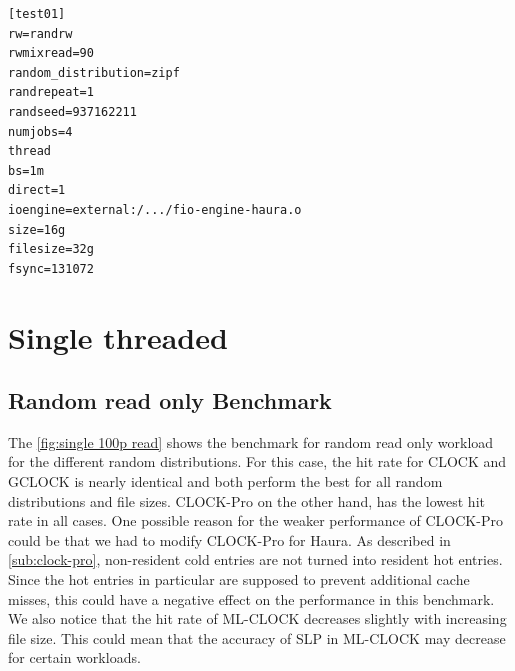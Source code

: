 \documentclass[
	12pt,
	a4paper,
	abstract,
	bibliography=totoc,
	chapterprefix,
	headings=openright,
	numbers=endperiod,
	parskip=half,
	twoside,
]{scrreprt}
\begin{document}
\bigskip
\newpage

\begin{lstlisting}[mathescape=true,caption={Example of a fio jobfile used for evaluation.}, label=lst:fio jobfile]
[test01]
rw=randrw
rwmixread=90
random_distribution=zipf
randrepeat=1
randseed=937162211
numjobs=4
thread
bs=1m
direct=1
ioengine=external:/.../fio-engine-haura.o
size=16g
filesize=32g
fsync=131072
\end{lstlisting}




\newpage
\section{Single threaded}
\subsection{Random read only Benchmark}

The \cref{fig:single 100p read} shows the benchmark for random read only workload for the different random distributions.
For this case, the hit rate for CLOCK and GCLOCK is nearly identical and both perform the best for all random distributions and file sizes. 
CLOCK-Pro on the other hand, has the lowest hit rate in all cases.
One possible reason for the weaker performance of CLOCK-Pro could be that we had to modify CLOCK-Pro for Haura.
As described in \ref{sub:clock-pro}, non-resident cold entries are not turned into resident hot entries.
Since the hot entries in particular are supposed to prevent additional cache misses, 
this could have a negative effect on the performance in this benchmark.
We also notice that the hit rate of ML-CLOCK decreases slightly with increasing file size.
This could mean that the accuracy of SLP in ML-CLOCK may decrease for certain workloads.
\end{document}
